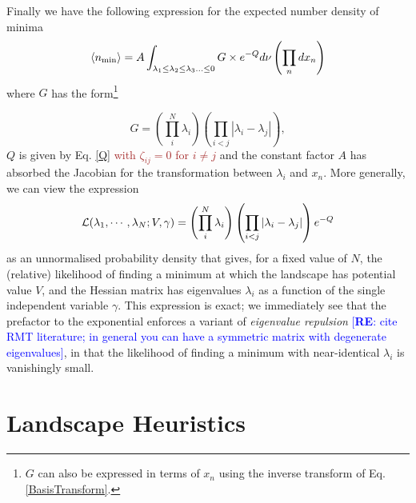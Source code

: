 \documentclass[12pt]{article}
\newcommand{\re}[1]{\textcolor{blue}{[{\bf RE}: #1]}}
\newcommand{\sh}[1]{\textcolor{brown}{#1}}
\begin{document}
Finally we have the following expression for the expected number density of minima 
%
\begin{equation} \label{DensityOfPeaks}
\langle n_{{\rm min}} \rangle = A \int_{\lambda_1 \leq \lambda_2 \leq \lambda_3 \ldots \leq 0} G \times e^{-Q} d\nu  \left(\prod_n dx_n\right)
\end{equation}
%
\noindent where $G$ has the form\footnote{$G$ can also be expressed in terms of $x_n$ using the inverse transform of Eq. \ref{BasisTransform}.}

\begin{equation}
G = \left(\prod_{i}^{N} \lambda_i \right)\left(\prod_{i<j} |\lambda_i-\lambda_j|\right),
\end{equation} 
%
$Q$ is given by Eq. \ref{Q} \sh{with $\zeta_{ij}=0$ for $i\neq j$} and the constant factor $A$ has absorbed the Jacobian for the transformation between $\lambda_i$ and $x_n$. More generally, we can view the expression
%
\begin{equation}
{\cal L}(\lambda_1,\cdots, \lambda_N; V, \gamma) = \left(\prod_{i}^{N} \lambda_i \right)\left(\prod_{i<j} |\lambda_i-\lambda_j|\right) e^{-Q}
\end{equation} 
%
as an unnormalised probability density that gives, for a fixed value of $N$, the (relative) likelihood of finding a minimum at which the landscape has potential value $V$, and the Hessian matrix has eigenvalues $\lambda_i$ as a function of the single independent variable $\gamma$. This expression is exact;  we immediately see that the prefactor to the exponential enforces a variant of {\em eigenvalue repulsion\/} \cite{Mehta1990} \re{cite RMT literature; in general you can have a symmetric matrix with degenerate eigenvalues}, in that the likelihood of finding a minimum with near-identical $\lambda_i$ is vanishingly small. 



\section{Landscape Heuristics}
\end{document}
